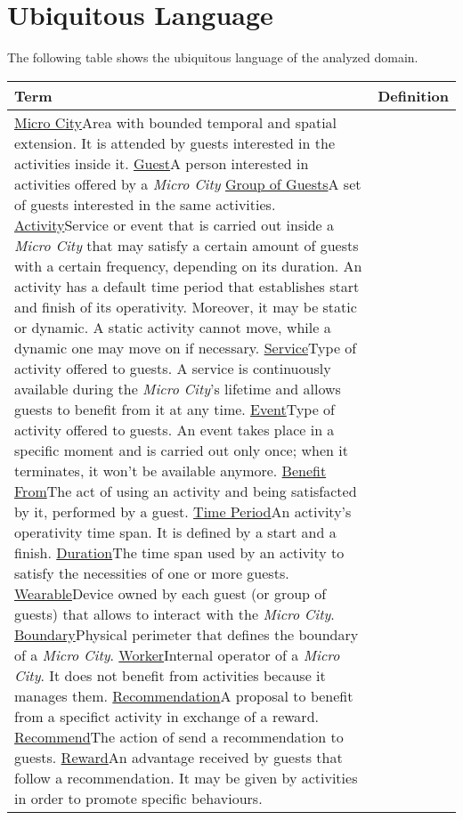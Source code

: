 \section{Ubiquitous Language}

The following table shows the ubiquitous language of the analyzed domain.

\begin{table}[H]
    \centering
    \begin{tabular}{|l|p{}|}
        \hline
        \textbf{Term} & \textbf{Definition}\\
        \hline
        \ul{Micro City}{Area with bounded temporal and spatial extension. It is attended by guests interested in the activities inside it.}
        \ul{Guest}{A person interested in activities offered by a \textit{Micro City}}
        \ul{Group of Guests}{A set of guests interested in the same activities.}
        \ul{Activity}{Service or event that is carried out inside a \textit{Micro City} that may satisfy a certain amount of guests with a certain frequency, depending on its duration. An activity has a default time period that establishes start and finish of its operativity. Moreover, it may be static or dynamic. A static activity cannot move, while a dynamic one may move on if necessary.}
        \ul{Service}{Type of activity offered to guests. A service is continuously available during the \textit{Micro City}'s lifetime and allows guests to benefit from it at any time.}
        \ul{Event}{Type of activity offered to guests. An event takes place in a specific moment and is carried out only once; when it terminates, it won't be available anymore.}
        \ul{Benefit From}{The act of using an activity and being satisfacted by it, performed by a guest.}
        \ul{Time Period}{An activity's operativity time span. It is defined by a start and a finish.}
        \ul{Duration}{The time span used by an activity to satisfy the necessities of one or more guests.}
        \ul{Wearable}{Device owned by each guest (or group of guests) that allows to interact with the \textit{Micro City}.}
        \ul{Boundary}{Physical perimeter that defines the boundary of a \textit{Micro City}.}
        \ul{Worker}{Internal operator of a \textit{Micro City}. It does not benefit from activities because it manages them.}
        \ul{Recommendation}{A proposal to benefit from a specifict activity in exchange of a reward.}
        \ul{Recommend}{The action of send a recommendation to guests.}
        \ul{Reward}{An advantage received by guests that follow a recommendation. It may be given by activities in order to promote specific behaviours.}

\end{tabular}
\end{table}
